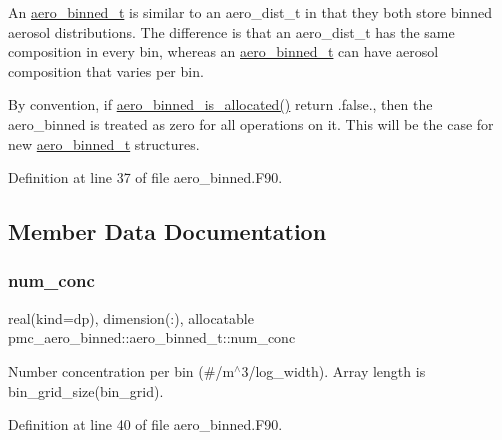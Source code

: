 An \mbox{\hyperlink{structpmc__aero__binned_1_1aero__binned__t}{aero\+\_\+binned\+\_\+t}} is similar to an aero\+\_\+dist\+\_\+t in that they both store binned aerosol distributions. The difference is that an aero\+\_\+dist\+\_\+t has the same composition in every bin, whereas an \mbox{\hyperlink{structpmc__aero__binned_1_1aero__binned__t}{aero\+\_\+binned\+\_\+t}} can have aerosol composition that varies per bin.

By convention, if \mbox{\hyperlink{namespacepmc__aero__binned_a3be8e75668295f81d711fb9e9c6e714b}{aero\+\_\+binned\+\_\+is\+\_\+allocated()}} return {\ttfamily }.false., then the aero\+\_\+binned is treated as zero for all operations on it. This will be the case for new {\ttfamily \mbox{\hyperlink{structpmc__aero__binned_1_1aero__binned__t}{aero\+\_\+binned\+\_\+t}}} structures. 

Definition at line 37 of file aero\+\_\+binned.\+F90.



\subsection{Member Data Documentation}
\mbox{\label{structpmc__aero__binned_1_1aero__binned__t_a98cd77584290aa648c1305968a0ad6c5}} 
\subsubsection{\texorpdfstring{num\+\_\+conc}{num\_conc}}
{\footnotesize\ttfamily real(kind=dp), dimension(\+:), allocatable pmc\+\_\+aero\+\_\+binned\+::aero\+\_\+binned\+\_\+t\+::num\+\_\+conc}



Number concentration per bin (\#/m$^\wedge$3/log\+\_\+width). Array length is {\ttfamily bin\+\_\+grid\+\_\+size(bin\+\_\+grid)}. 



Definition at line 40 of file aero\+\_\+binned.\+F90.

\mbox{\label{structpmc__aero__binned_1_1aero__binned__t_a7953a94fa272ec829aaadf5be0a9fdc3}} 
